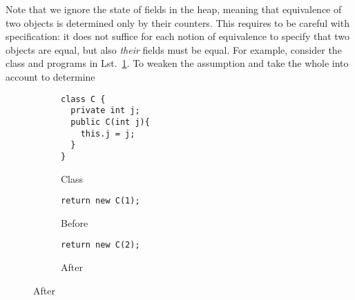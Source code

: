 Note that we ignore the state of fields in the heap, meaning that equivalence of two objects is determined only by their counters. 
This requires to be careful with specification: it does not suffice for each notion of equivalence to specify that two objects are equal, but also \emph{their} fields must be equal.
For example, consider the class and programs in Lst.~\ref{lst:ObjectCreation-refinity-2}. To weaken the assumption and take the whole into account to determine  

\begin{figure}[tb]
\centering
\begin{subfigure}{.3\linewidth}
\begin{lstlisting}[style=refinity]
class C {
  private int j;
  public C(int j){
    this.j = j;
  }
}
\end{lstlisting}
\caption{Class}
\end{subfigure}\hspace{2mm}
\begin{subfigure}{.3\linewidth}
\begin{lstlisting}[style=refinity]
return new C(1);
\end{lstlisting}
\caption{Before}
\end{subfigure}\hspace{2mm}
\begin{subfigure}{.3\linewidth}
\begin{lstlisting}[style=refinity]
return new C(2);
\end{lstlisting}
    \caption{After}
  \end{subfigure}
\label{lst:ObjectCreation-refinity-2}
\end{figure}



